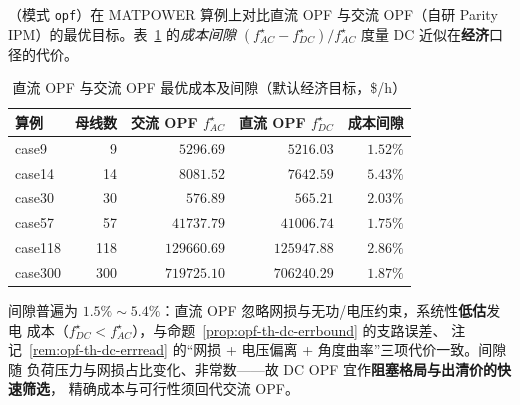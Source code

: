 （模式 \texttt{opf}）在 MATPOWER 算例上对比直流 OPF
与交流 OPF（自研 Parity IPM）的最优目标。表~\ref{tab:opf-th-dc-gap} 的\emph{成本间隙}
$(f_{AC}^\star-f_{DC}^\star)/f_{AC}^\star$ 度量 DC 近似在\textbf{经济}口径的代价。
\begin{table}[H]\centering\footnotesize
\caption{直流 OPF 与交流 OPF 最优成本及间隙（默认经济目标，\$/h）}
\label{tab:opf-th-dc-gap}
\begin{tabular}{@{}lrrrr@{}}
\toprule
算例 & 母线数 & 交流 OPF $f_{AC}^\star$ & 直流 OPF $f_{DC}^\star$ & 成本间隙\\
\midrule
case9   & 9   & $5296.69$   & $5216.03$   & $1.52\%$\\
case14  & 14  & $8081.52$   & $7642.59$   & $5.43\%$\\
case30  & 30  & $576.89$    & $565.21$    & $2.03\%$\\
case57  & 57  & $41737.79$  & $41006.74$  & $1.75\%$\\
case118 & 118 & $129660.69$ & $125947.88$ & $2.86\%$\\
case300 & 300 & $719725.10$ & $706240.29$ & $1.87\%$\\
\bottomrule
\end{tabular}
\end{table}
间隙普遍为 $1.5\%\sim5.4\%$：直流 OPF 忽略网损与无功/电压约束，系统性\textbf{低估}发电
成本（$f_{DC}^\star<f_{AC}^\star$），与命题~\ref{prop:opf-th-dc-errbound} 的支路误差、
注记~\ref{rem:opf-th-dc-errread} 的“网损 + 电压偏离 + 角度曲率”三项代价一致。间隙随
负荷压力与网损占比变化、非常数——故 DC OPF 宜作\textbf{阻塞格局与出清价的快速筛选}，
精确成本与可行性须回代交流 OPF。

